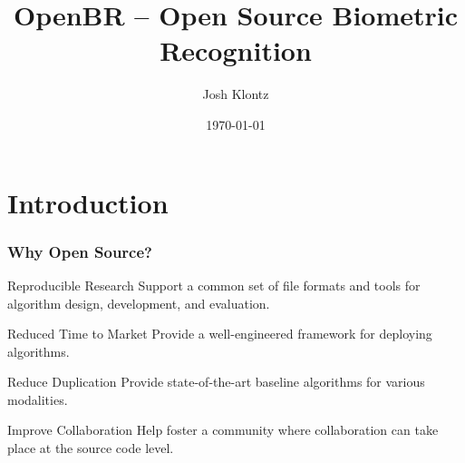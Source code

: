 \documentclass[12pt]{beamer}
\title[OpenBR]{OpenBR -- Open Source Biometric Recognition}
\author[J. Klontz]{Josh Klontz}
\institute[]
{
\small
\emph{www.openbiometrics.org}
}
\date{\today}
\begin{document}
\begin{frame}
\titlepage
\end{frame}

\section{Introduction}
\begin{frame}
\frametitle{Why Open Source?}
\pause
\begin{block}{Reproducible Research}
Support a common set of file formats and tools for algorithm design, development, and evaluation.
\end{block}
\pause
\begin{block}{Reduced Time to Market}
Provide a well-engineered framework for deploying algorithms.
\end{block}
\pause
\begin{block}{Reduce Duplication}
Provide state-of-the-art baseline algorithms for various modalities.
\end{block}
\pause
\begin{block}{Improve Collaboration}
Help foster a community where collaboration can take place at the source code level.
\end{block}
\end{frame}
\end{document}

